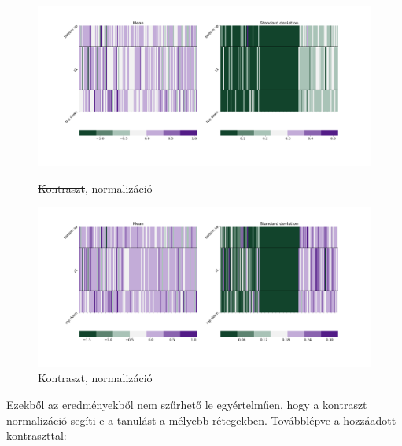 \documentclass[12pt, english]{article}
\begin{document}
\begin{figure}[H]
  \begin{minipage}{0.5\linewidth}
    \centering
    \includegraphics[width=.75\linewidth]{z1_vis/z1_vis_no_contrast_norm/17_DenseLinLinLadderVAE_contrastNorm-stats-1_vector_comparisons_1.png} 
    \caption{\st{Kontraszt}, normalizáció}
    \label{fig:sample-norm-no-contrast-1}
  \end{minipage}
  \begin{minipage}{0.5\linewidth}
    \centering
    \includegraphics[width=.75\linewidth]{z1_vis/z1_vis_no_contrast_norm/17_DenseLinLinLadderVAE_contrastNorm-stats-2_vector_comparisons_1.png}
    \caption{\st{Kontraszt}, normalizáció}
    \label{fig:sample-norm-no-contrast-2}
  \end{minipage}
\end{figure}

\vspace{4mm}

\par Ezekből az eredményekből nem szűrhető le egyértelműen, hogy a kontraszt normalizáció segíti-e a tanulást a mélyebb rétegekben. Továbblépve a hozzáadott kontraszttal:

\vspace{4mm}
\end{document}
